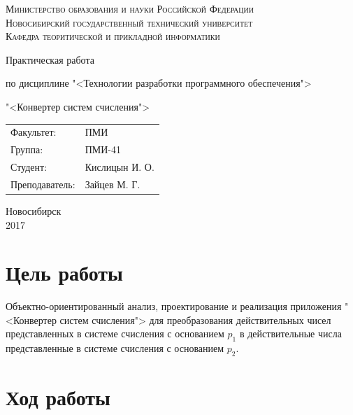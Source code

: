 \documentclass[oneside, final, 10pt]{extarticle}
\begin{document}
\begin{titlepage}
	\begin{centering}
		\textsc{Министерство образования и науки Российской Федерации}\\
		\textsc{Новосибирский государственный технический университет}\\
		\textsc{Кафедра теоритической и прикладной информатики}\\
	\end{centering}
	\vfill
	\vfill
	\vfill
	\Large
	\centerline{Практическая работа}
	\centerline{по дисциплине "<Технологии разработки программного обеспечения">}
	\centerline{ "<Конвертер систем счисления">}
	\normalsize
	\vfill
	\vfill
	\vfill
	\begin{flushleft}
		\begin{minipage}{0.3\textwidth}
			\begin{tabular}{l l}
				Факультет: & ПМИ\\
				Группа: & ПМИ-41\\
				Студент: & Кислицын И. О.\\
				Преподаватель: & Зайцев М. Г.
			\end{tabular}
		\end{minipage}
	\end{flushleft}
	\vfill
	\vfill
	\begin{centering}
		Новосибирск\\
		2017\\
	\end{centering}
\end{titlepage}
\setcounter{page}{2}
\lstset{
	breaklines=\true,
	basicstyle=\footnotesize\ttfamily,
	tabsize=2,
	showspaces=\false,
	breaklines=\true,
	breakatwhitespace=\true,
	extendedchars=\true,
	keepspaces=\true
}
\section{Цель работы}

Объектно-ориентированный анализ, проектирование и реализация приложения "<Конвертер систем счисления"> для преобразования действительных чисел представленных в системе счисления с основанием \(p_1\) в действительные числа представленные в системе счисления с основанием \(p_2\).

\section{Ход работы}
\end{document}
